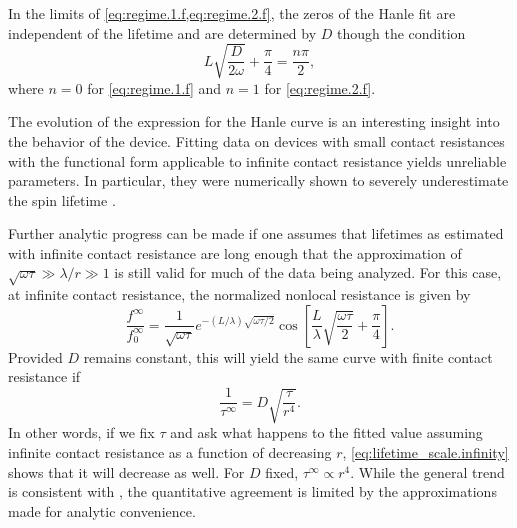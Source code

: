 In the limits of \cref{eq:regime.1.f,eq:regime.2.f},
the zeros of the Hanle fit are independent of the lifetime
and are determined by $D$ though the condition
\begin{equation}
  L \sqrt{\frac{D}{2 ω}} + \frac{π}{4} = \frac{n π}{2} ,
\end{equation}
where $n = 0$ for \cref{eq:regime.1.f} and $n = 1$ for \cref{eq:regime.2.f}.

The evolution of the expression for the Hanle curve
is an interesting insight into the behavior of the device.
Fitting data on devices with small contact resistances
with the functional form applicable to infinite contact resistance
yields unreliable parameters.
In particular, they were numerically shown to severely underestimate the spin lifetime
\cite{PhysRevB.86.235408}.

Further analytic progress can be made if one assumes that
lifetimes as estimated with infinite contact resistance are long
enough that the approximation of $\sqrt{ω τ} ≫ λ / r ≫ 1$
is still valid for much of the data being analyzed.
For this case, at infinite contact resistance,
the normalized nonlocal resistance is given by
\begin{equation}
  \frac{f^∞}{f^∞_0} = \frac{1}{ \sqrt{ω τ}}
                      e^{- \left( L / λ \right) \sqrt{ω τ / 2}}
                      \cos{\left[ \frac{L}{λ} \sqrt{\frac{ω τ}{2}} + \frac{π}{4} \right]} .
\end{equation}
Provided $D$ remains constant,
this will yield the same curve with finite contact resistance if
\begin{equation}
  \label{eq:lifetime_scale.infinity}
  \frac{1}{τ^∞} = D \sqrt{\frac{τ}{r^4}} .
\end{equation}
In other words, if we fix $τ$ and ask what happens to the fitted value
assuming infinite contact resistance as a function of decreasing $r$,
\cref{eq:lifetime_scale.infinity} shows that it will decrease as well.
For $D$ fixed, $τ^∞ ∝ r^4$.
While the general trend is consistent with
\cite{PhysRevB.86.235408},
the quantitative agreement is limited by
the approximations made for analytic convenience.
